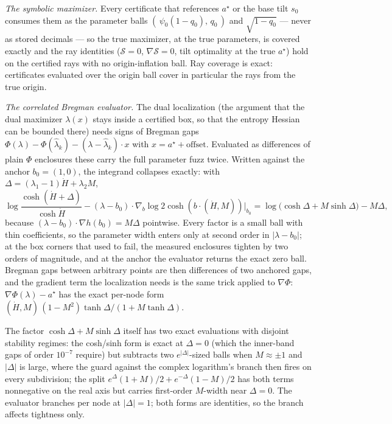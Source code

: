 \documentclass[11pt]{article}
\theoremstyle{remark}
\newcommand{\sS}{\mathcal{S}}
\begin{document}
\emph{The symbolic maximizer.}  Every certificate that references
$a^\star$ or the base tilt $s_0$ consumes them as the parameter balls
$(\,\psi_0(1-q_0),\,q_0\,)$ and $\sqrt{1-q_0}$ --- never as stored
decimals --- so the true maximizer, at the true parameters, is
covered exactly and the ray identities ($\sS=0$, $\nabla\sS=0$, tilt
optimality at the true $a^\star$) hold on the certified rays with no
origin-inflation ball.  Ray coverage is exact: certificates evaluated
over the origin ball cover in particular the rays from the true
origin.

\emph{The correlated Bregman evaluator.}  The dual localization
(the argument that the dual maximizer $\lambda(x)$ stays inside a
certified box, so that the entropy Hessian can be bounded there)
needs signs of Bregman gaps
$\Phi(\lambda)-\Phi(\hat\lambda_k)-(\lambda-\hat\lambda_k)\cdot x$
with $x=a^\star+\text{offset}$.  Evaluated as differences of plain
$\Phi$ enclosures these carry the full parameter fuzz twice.  Written
against the anchor $b_0=(1,0)$, the integrand collapses exactly:
with $\Delta=(\lambda_1-1)\dot H+\lambda_2M$,
\[
\log\frac{\cosh(\dot H+\Delta)}{\cosh\dot H}
-(\lambda-b_0)\cdot\nabla_b\log2\cosh(b\cdot(\dot H,M))\big|_{b_0}
=\log\bigl(\cosh\Delta+M\sinh\Delta\bigr)-M\Delta ,
\]
because $(\lambda-b_0)\cdot\nabla h(b_0)=M\Delta$ pointwise.  Every
factor is a small ball with thin coefficients, so the parameter
width enters only at second order in $|\lambda-b_0|$; at the box
corners that used to fail, the measured enclosures tighten by two
orders of magnitude, and at the anchor the evaluator returns the
exact zero ball.  Bregman gaps between arbitrary points are then
differences of two anchored gaps, and the gradient term the
localization needs is the same trick applied to $\nabla\Phi$:
$\nabla\Phi(\lambda)-a^\star$ has the exact per-node form
$(\dot H,M)\,(1-M^2)\tanh\Delta/(1+M\tanh\Delta)$.

The factor $\cosh\Delta+M\sinh\Delta$ itself has two exact
evaluations with disjoint stability regimes: the cosh/sinh form is
exact at $\Delta=0$ (which the inner-band gaps of order $10^{-7}$
require) but subtracts two $e^{|\Delta|}$-sized balls when
$M\approx\pm1$ and $|\Delta|$ is large, where the guard against the
complex logarithm's branch then fires on every subdivision; the
split $e^{\Delta}(1+M)/2+e^{-\Delta}(1-M)/2$ has both terms
nonnegative on the real axis but carries first-order $M$-width near
$\Delta=0$.  The evaluator branches per node at $|\Delta|=1$; both
forms are identities, so the branch affects tightness only.
\end{document}
